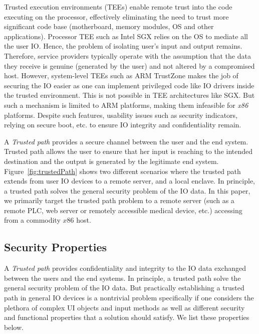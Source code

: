 Trusted execution environments (TEEs) enable remote trust into the code executing on the processor, effectively eliminating the need to trust more significant code base (motherboard, memory modules, OS and other applications). Processor TEE such as Intel SGX relies on the OS to mediate all the user IO. Hence, the problem of isolating user's input and output remains. Therefore, service providers typically operate with the assumption that the data they receive is genuine (generated by the user) and not altered by a compromised host. However, system-level TEEs such as ARM TrustZone makes the job of securing the IO easier as one can implement privileged code like IO drivers inside the trusted environment. This is not possible in TEE architectures like SGX. But such a mechanism is limited to ARM platforms, making them infeasible for \emph{x86} platforms. Despite such features, usability issues such as security indicators, relying on secure boot, etc. to ensure IO integrity and confidentiality remain.


A \emph{Trusted path} provides a secure channel between the user and the end system. Trusted path allows the user to ensure that her input is reaching to the intended destination and the output is generated by the legitimate end system. Figure~\ref{fig:trustedPath} shows two different scenarios where the trusted path extends from user IO devices to \one a remote server, and \two a local enclave. In principle, a trusted path solves the general security problem of the IO data. 
In this paper, we primarily target the trusted path problem to a remote server (such as a remote PLC, web server or remotely accessible medical device, etc.) accessing from a commodity $x86$ host.

\iffalse
\subsection{Security Properties}

A \emph{Trusted path} provides confidentiality and integrity to the IO data exchanged between the users and the end systems. In principle, a trusted path solve the general security problem of the IO data. But practically establishing a trusted path in general IO devices is a nontrivial problem specifically if one considers the plethora of complex UI objects and input methods as well as different security and functional properties that a solution should satisfy. We list these properties below. 


